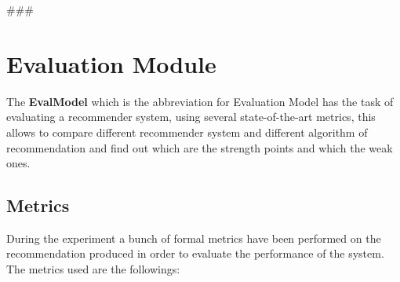 


\usepackage{comment}
\usepackage{hyperref}


###

\section{Evaluation Module}\label{sec:eva-module}
The \textbf{EvalModel} which is the abbreviation for Evaluation Model has the task of evaluating a recommender system,
using several state-of-the-art metrics, this allows to compare different recommender system and different algorithm of
recommendation and find out which are the strength points and which the weak ones.

\subsection{Metrics}\label{subsec:metrics}
During the experiment a bunch of formal metrics have been performed on the recommendation produced in order to evaluate
the performance of the system.
The metrics used are the followings:
\hfill\break

